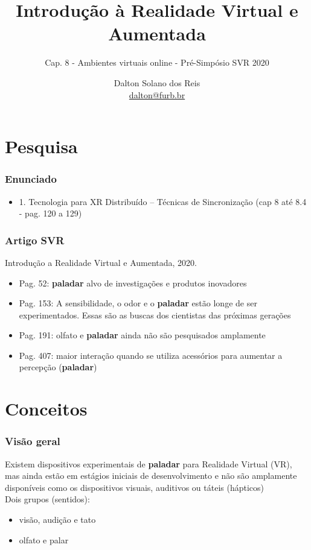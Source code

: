 \documentclass{beamer}
\title[Introdução à Realidade Virtual e Aumentada]{Introdução à Realidade Virtual e Aumentada}
\subtitle{Cap. 8 - Ambientes virtuais online - Pré-Simpósio SVR 2020}
\author[Dalton Solano dos Reis]{
  Dalton Solano dos Reis\texorpdfstring{\\\medskip}{}%
  {\small \href{mailto:dalton@furb.br}{dalton@furb.br}}}
\institute[UDESC]{
  Centro de Ciências e Tecnológicas\\
  Universidade do Estado de Santa Catarina}
\begin{document}
\begin{frame}
  \titlepage

\end{frame}

\section{Pesquisa}
\begin{frame}
  \frametitle{Enunciado}
  \begin{itemize}
    \item 1. Tecnologia para XR Distribuído – Técnicas de Sincronização (cap 8 até   8.4 - pag. 120 a 129)  
  \end{itemize}
\end{frame}

\begin{frame}
  \frametitle{Artigo SVR}
  Introdução a Realidade Virtual e Aumentada, 2020. \\
  \begin{itemize}
    \item Pag. 52: \textbf{paladar} alvo de investigações e produtos inovadores
    \item Pag. 153: A sensibilidade, o odor e o \textbf{paladar} estão longe de ser experimentados. Essas são as buscas dos cientistas das próximas gerações
    \item Pag. 191: olfato e \textbf{paladar} ainda não são pesquisados amplamente
    \item Pag. 407: maior interação quando se utiliza acessórios para aumentar a percepção (\textbf{paladar})
  \end{itemize}
  \begin{flushright}
    \scriptsize
    \cite{toriIntroducaoRealidadeVirtual2020}
  \end{flushright}
\end{frame}

\section{Conceitos}
\begin{frame}
  \frametitle{Visão geral}
  Existem dispositivos experimentais de \textbf{paladar} para Realidade Virtual (VR), mas ainda estão em estágios iniciais de desenvolvimento e não são amplamente disponíveis como os dispositivos visuais, auditivos ou táteis (hápticos) \\
  \vspace{\baselineskip}
  Dois grupos (sentidos):
  \begin{itemize}
  \item visão, audição e tato
  \item olfato e palar
  \end{itemize}
\end{frame}
\end{document}
